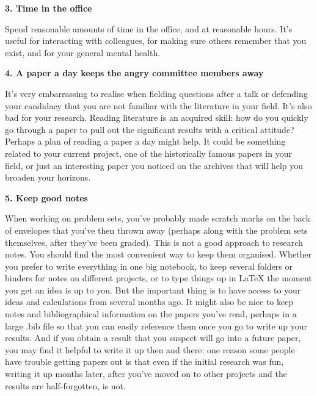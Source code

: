 \documentclass[onecolumn]{aastex7}
\newcommand{\Header}[1]{{\large{\bf{#1}}}}
\begin{document}
\Header{3. Time in the office}

Spend reasonable amounts of time in the office, and at reasonable hours. It's useful for interacting with colleagues, for making sure others remember that you exist, and for your general mental health.

\Header{4. A paper a day keeps the angry committee members away}

It's very embarrassing to realise when fielding questions after a talk or defending your candidacy that you are not familiar with the literature in your field.  It's also bad for your research.  Reading literature is an acquired skill: how do you quickly go through a paper to pull out the significant results with a critical attitude?  Perhaps a plan of reading a paper a day might help.  It could be something related to your current project, one of the historically famous papers in your field, or just an interesting paper you noticed on the archives that will help you broaden your horizons.

\Header{5. Keep good notes}

When working on problem sets, you've probably made scratch marks on the back of envelopes that you've then thrown away (perhaps along with the problem sets themselves, after they've been graded).  This is not a good approach to research notes.  You should find the most convenient way to keep them organised.  Whether you prefer to write everything in one big notebook, to keep several folders or binders for notes on different projects, or to type things up in LaTeX the moment you get an idea is up
to you.  But the important thing is to have access to your ideas and calculations from several months ago.  It might also be nice to keep notes and bibliographical information on the papers you've read, perhaps in a large .bib file so that you can easily reference them once you go to write up your results.  And if you obtain a result that you suspect will go into a future paper, you may find it helpful to write it up then and there: one reason some people have trouble getting papers out is that even if the initial research was fun, writing it up months later, after you've moved on to other projects and the results are half-forgotten, is not.
\end{document}

